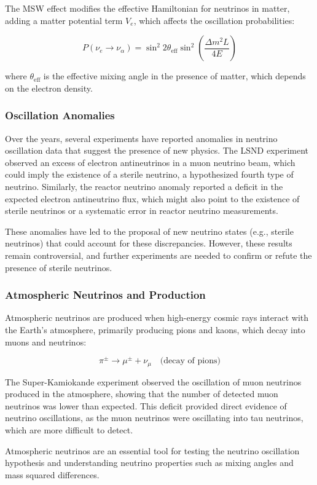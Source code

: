 \documentclass[a4paper,12pt,numbered]{article}
\begin{document}
The MSW effect modifies the effective Hamiltonian for neutrinos in matter, adding a matter potential term \( V_e \), which affects the oscillation probabilities:

\[
P(\nu_e \to \nu_\alpha) = \sin^2 2\theta_{\text{eff}} \sin^2 \left(\frac{\Delta m^2 L}{4E}\right)
\]

where \( \theta_{\text{eff}} \) is the effective mixing angle in the presence of matter, which depends on the electron density.

\subsubsection{Oscillation Anomalies}
Over the years, several experiments have reported anomalies in neutrino oscillation data that suggest the presence of new physics. The LSND experiment observed an excess of electron antineutrinos in a muon neutrino beam, which could imply the existence of a sterile neutrino, a hypothesized fourth type of neutrino. Similarly, the reactor neutrino anomaly reported a deficit in the expected electron antineutrino flux, which might also point to the existence of sterile neutrinos or a systematic error in reactor neutrino measurements.

These anomalies have led to the proposal of new neutrino states (e.g., sterile neutrinos) that could account for these discrepancies. However, these results remain controversial, and further experiments are needed to confirm or refute the presence of sterile neutrinos.

\subsubsection{Atmospheric Neutrinos and Production}
Atmospheric neutrinos are produced when high-energy cosmic rays interact with the Earth's atmosphere, primarily producing pions and kaons, which decay into muons and neutrinos:

\[
\pi^\pm \to \mu^\pm + \nu_\mu \quad \text{(decay of pions)}
\]

The Super-Kamiokande experiment observed the oscillation of muon neutrinos produced in the atmosphere, showing that the number of detected muon neutrinos was lower than expected. This deficit provided direct evidence of neutrino oscillations, as the muon neutrinos were oscillating into tau neutrinos, which are more difficult to detect.

Atmospheric neutrinos are an essential tool for testing the neutrino oscillation hypothesis and understanding neutrino properties such as mixing angles and mass squared differences.
\end{document}
